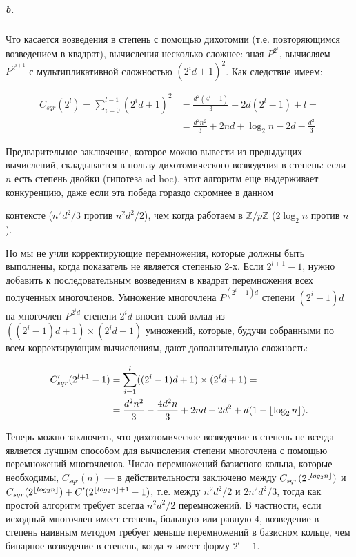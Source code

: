 \documentclass{../../template/mai_book}
\DeclarePairedDelimiter{\floor}{\lfloor}{\rfloor}
\begin{document}
\subparagraph{b.} Что касается возведения в степень с помощью дихотомии (т.е. повторяющимся возведением в квадрат), вычисления несколько сложнее: зная $P^{2^i}$, вычисляем $P^{2^{i + 1}}$ с мультипликативной сложностью $(2^i d + 1)^2$. Как следствие имеем:

\begin{equation*}
	\begin{split}
	C_{sqr}(2^l) = \sum_{i = 0}^{l - 1} (2^i d + 1)^2 &= \frac{d^2 (4^l - 1)}{3} + 2d(2^l - 1) + l =
	\\
	&= \frac{d^2 n^2}{3} + 2nd + \log_2 n - 2d - \frac{d^2}{3}
	\end{split}
\end{equation*}

\noindent
Предварительное заключение, которое можно вывести из предыдущих вычислений, складывается в пользу дихотомического возведения в степень: если $n$ есть степень двойки (гипотеза ad hoc), этот алгоритм еще выдерживает конкуренцию, даже если эта победа гораздо скромнее в данном \linebreak

\newpage


\noindent
контексте ($n^2 d^2 / 3$ против $n^2 d^2 / 2$), чем когда работаем в $\mathbb{Z} / p \mathbb{Z}$ ($2 \log_2 n$ против $n$).

Но мы не учли корректирующие перемножения, которые должны быть выполнены, когда показатель не является степенью 2-х. Если $2^{l + 1} - 1$, нужно добавить к последовательным возведениям в квадрат перемножения всех полученных многочленов. Умножение многочлена $P^{(2^i - 1)d}$ степени $(2^i - 1)d$ на многочлен $P^{2^i d}$ степени $2^i d$ вносит свой вклад из $((2^i - 1)d + 1) \times (2^i d + 1)$ умножений, которые, будучи собранными по всем корректирующим вычислениям, дают дополнительную сложность:

\begin{equation*}
	\begin{split}
	C_{sqr}'(2^{l + 1} - 1) &= \sum_{i = 1}^l ((2^i - 1)d + 1) \times (2^i d + 1) =
	\\
	&= \frac{d^2 n^2}{3} - \frac{4d^2 n}{3} + 2nd -2d^2 + d(1 - \floor{\log_2 n} ).
	\end{split}
\end{equation*}

\noindent
Теперь можно заключить, что дихотомическое возведение в степень не всегда является лучшим способом для вычисления степени многочлена с помощью перемножений многочленов. Число перемножений базисного кольца, которые необходимы, $C_{sqr}(n)$ — в действительности заключено между $C_{sqr}(2^{\floor{log_2 n}})$ и $C_{sqr}(2^{\floor{log_2 n}}) + C'(2^{\floor{log_2 n} + 1} - 1)$, т.е. между $n^2 d^2 / 2$ и $2n^2 d^2 / 3$, тогда как простой алгоритм требует всегда $n^2 d^2 / 2$ перемножений. В частности, если исходный многочлен имеет степень, большую или равную 4, возведение в степень наивным методом  требует меньше перемножений в базисном кольце, чем бинарное возведение в степень, когда $n$ имеет форму $2^l - 1$. \newline
\end{document}
